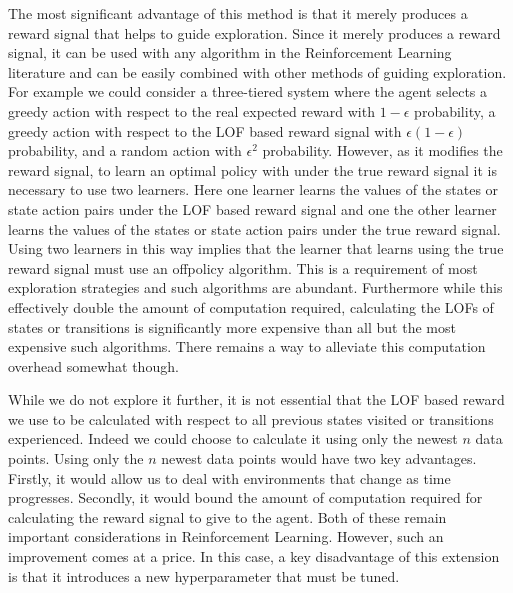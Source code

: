 \documentclass[../main.tex]{subfiles}
\begin{document}
The most significant advantage of this method is that it merely produces a reward signal that helps to guide exploration. Since it merely produces a reward signal, it can be used with any algorithm in the Reinforcement Learning literature and can be easily combined with other methods of guiding exploration. For example we could consider a three-tiered system where the agent selects a greedy action with respect to the real expected reward with $1 - \epsilon$ probability, a greedy action with respect to the LOF based reward signal with $\epsilon(1 - \epsilon)$ probability, and a random action with $\epsilon^2$ probability. However, as it modifies the reward signal, to learn an optimal policy with under the true reward signal it is necessary to use two learners. Here one learner learns the values of the states or state action pairs under the LOF based reward signal and one the other learner learns the values of the states or state action pairs under the true reward signal. Using two learners in this way implies that the learner that learns using the true reward signal must use an offpolicy algorithm. This is a requirement of most exploration strategies and such algorithms are abundant. Furthermore while this effectively double the amount of computation required, calculating the LOFs of states or transitions is significantly more expensive than all but the most expensive such algorithms. There remains a way to alleviate this computation overhead somewhat though.

While we do not explore it further, it is not essential that the LOF based reward we use to be calculated with respect to all previous states visited or transitions experienced. Indeed we could choose to calculate it using only the newest $n$ data points. Using only the $n$ newest data points would have two key advantages. Firstly, it would allow us to deal with environments that change as time progresses. Secondly, it would bound the amount of computation required for calculating the reward signal to give to the agent. Both of these remain important considerations in Reinforcement Learning. However, such an improvement comes at a price. In this case, a key disadvantage of this extension is that it introduces a new hyperparameter that must be tuned.
\end{document}

